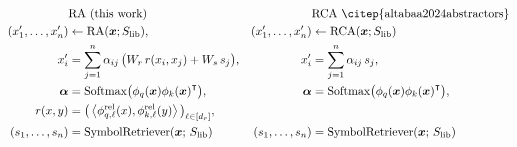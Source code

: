 \begin{align*}
&\text{RA (this work)}    & &\text{RCA \citep{altabaa2024abstractors}}\\
(x_1', \ldots, x_n') &\gets \RA(\x; \Slib), & (x_1', \ldots, x_n') &\gets \RCA(\x; \Slib)\\
x_i' &= \sum_{j=1}^{n} \alpha_{ij} \, \bigparen{W_r \, r(x_i, x_j) + W_s \, s_j}, & x_i' &= \sum_{j=1}^{n} \alpha_{ij} \, s_j,\\
\bm{\alpha} &= \Softmax\bigparen{\phi_q(\x) {\phi_k(\x)}^\intercal}, & \bm{\alpha} &= \Softmax\bigparen{\phi_q(\x) {\phi_k(\x)}^\intercal},\\
r(x, y) &= \bigparen{\iprod{\phi_{q,\ell}^{\rel}(x)}{\phi_{k,\ell}^{\rel}(y)}}_{\ell \in [d_r]}, & \\
(s_1, \ldots, s_n) &= \SymbolRetriever(\x;\,\Slib) & (s_1, \ldots, s_n) &= \SymbolRetriever(\x;\,\Slib)
\end{align*}


